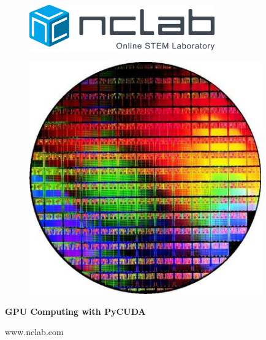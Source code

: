 \documentclass{article}
\begin{document}
\large

\vbox{}
\begin{figure}[!ht]
\includegraphics[width=8cm]{img/logo.png}
\vspace{16mm}
\end{figure}

\begin{figure}[!ht]
\begin{center}
\includegraphics[width=10cm]{img/cuda-frontpage.png}
\vspace{18mm}
\end{center}
\end{figure}

\centerline{\Huge \bf GPU Computing with PyCUDA}

\vfill

\centerline{\Large www.nclab.com}

\newpage




\section*{}


\end{document}
